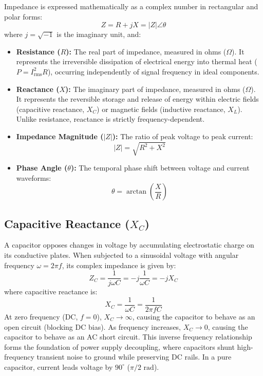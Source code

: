 Impedance is expressed mathematically as a complex number in rectangular and polar forms:
\begin{equation}
    Z = R + jX = |Z|\angle\theta
\end{equation}
where $j = \sqrt{-1}$ is the imaginary unit, and:
\begin{itemize}[leftmargin=1.5em]
    \item \textbf{Resistance ($R$):} The real part of impedance, measured in ohms ($\Omega$). It represents the irreversible dissipation of electrical energy into thermal heat ($P = I_{\text{rms}}^2 R$), occurring independently of signal frequency in ideal components.
    \item \textbf{Reactance ($X$):} The imaginary part of impedance, measured in ohms ($\Omega$). It represents the reversible storage and release of energy within electric fields (capacitive reactance, $X_C$) or magnetic fields (inductive reactance, $X_L$). Unlike resistance, reactance is strictly frequency-dependent.
    \item \textbf{Impedance Magnitude ($|Z|$):} The ratio of peak voltage to peak current:
    \begin{equation}
        |Z| = \sqrt{R^2 + X^2}
    \end{equation}
    \item \textbf{Phase Angle ($\theta$):} The temporal phase shift between voltage and current waveforms:
    \begin{equation}
        \theta = \arctan\left(\frac{X}{R}\right)
    \end{equation}
\end{itemize}

\subsection{Capacitive Reactance (\texorpdfstring{$X_C$}{X\_C})}
A capacitor opposes changes in voltage by accumulating electrostatic charge on its conductive plates. When subjected to a sinusoidal voltage with angular frequency $\omega = 2\pi f$, its complex impedance is given by:
\begin{equation}
    Z_C = \frac{1}{j\omega C} = -j\frac{1}{\omega C} = -j X_C
\end{equation}
where capacitive reactance is:
\begin{equation}
    X_C = \frac{1}{\omega C} = \frac{1}{2\pi f C}
\end{equation}
At zero frequency (DC, $f = 0$), $X_C \to \infty$, causing the capacitor to behave as an open circuit (blocking DC bias). As frequency increases, $X_C \to 0$, causing the capacitor to behave as an AC short circuit. This inverse frequency relationship forms the foundation of power supply decoupling, where capacitors shunt high-frequency transient noise to ground while preserving DC rails. In a pure capacitor, current leads voltage by $90^\circ$ ($\pi/2\text{ rad}$).

